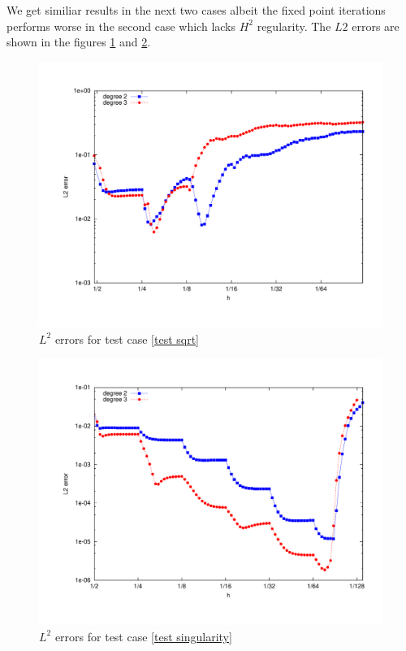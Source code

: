  We get similiar results in the next two cases albeit the fixed point iterations performs worse in the second case which lacks $H^2$ regularity. The $L2$ errors are shown in the figures \ref{fig: l2 errors test sqrt ourMethod} and \ref{fig: l2 errors test singularity ourMethod}.
 
\begin{figure}[H]
\centering
	\includegraphics[scale =0.4]{plots/MA3.pdf}
	\caption{$L^2$ errors for test case \ref{test sqrt}}
	\label{fig: l2 errors test sqrt ourMethod}
\end{figure}


\begin{figure}[H]
\centering
	\includegraphics[scale =0.4]{plots/MA2.pdf}
	\caption{$L^2$ errors for test case \ref{test singularity}}
	\label{fig: l2 errors test singularity ourMethod}
\end{figure}

